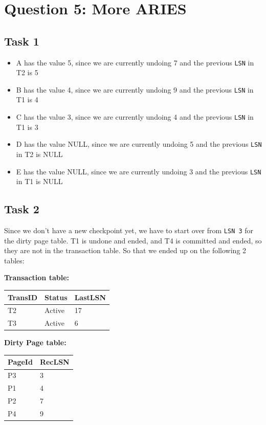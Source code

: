 \documentclass[12pt,a4paper]{article}
\begin{document}
\section{Question 5: More ARIES}
\subsection{Task 1}
\begin{itemize}
	\item A has the value 5, since we are currently undoing 7 and the previous \texttt{LSN} in T2 is 5	
	\item B has the value 4, since we are currently undoing 9 and the previous \texttt{LSN} in T1 is 4
	\item C has the value 3, since we are currently undoing 4 and the previous \texttt{LSN} in T1 is 3
	\item D has the value NULL, since we are currently undoing 5 and the previous \texttt{LSN} in T2 is NULL
	\item E has the value NULL, since we are currently undoing 3 and the previous \texttt{LSN} in T1 is NULL
\end{itemize}

\subsection{Task 2}
Since we don't have a new checkpoint yet, we have to start over from \texttt{LSN 3} for the dirty page table.
T1 is undone and ended, and T4 is committed and ended, so they are not in the transaction table.
So that we ended up on the following 2 tables:

\textbf{Transaction table:}
\begin{table}[!htbp]
    \centering
    \begin{tabularx}{\textwidth}{l|l|l}
        \hline
        TransID & Status & LastLSN \\ 
        \hline
        T2 & Active & 17 \\
        T3 & Active &  6 \\         
        \hline
    \end{tabularx}
\end{table}

\textbf{Dirty Page table:}
\begin{table}[!htbp]
    \centering
    \begin{tabularx}{\textwidth}{l|l}
        \hline
        PageId & RecLSN \\ 
        \hline
        P3 & 3 \\
        P1 & 4 \\
        P2 & 7 \\
        P4 & 9 \\         
        \hline
    \end{tabularx}
\end{table}
\end{document}
